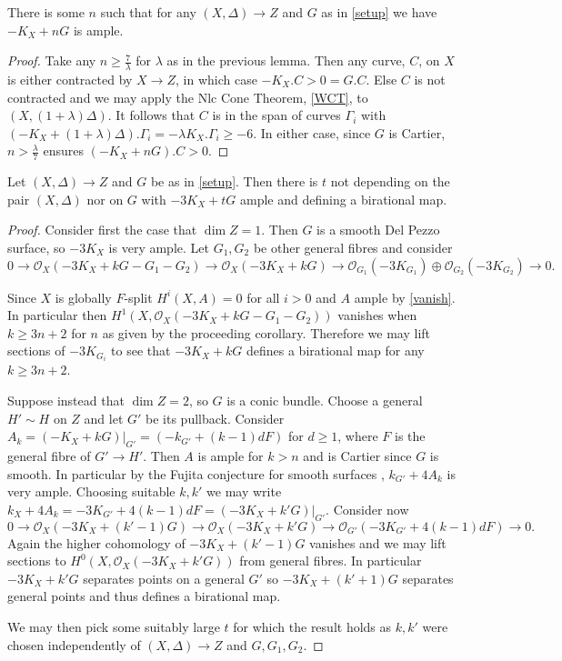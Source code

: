 \documentclass[a4paper,12pt]{book}
\newcommand{\ox}{\mathcal{O}_{X}}
\begin{document}
	\begin{corollary}\label{nAmple}
	There is some $n$ such that for any $(X,\Delta) \to Z$ and $G$ as in \autoref{setup} we have $-K_{X}+nG$ is ample.
\end{corollary}


\begin{proof}
	Take any $n \geq \frac{7}{\lambda}$ for $\lambda$ as in the previous lemma. Then any curve, $C$, on $X$ is either contracted by $X \to Z$, in which case $-K_{X}.C>0=G.C$. Else $C$ is not contracted and we may apply the Nlc Cone Theorem, \autoref{WCT}, to $(X,(1+\lambda)\Delta)$. It follows that $C$ is in the span of curves $\Gamma_{i}$ with $(-K_{X}+(1+\lambda)\Delta).\Gamma_{i} = -\lambda K_{X}.\Gamma_{i} \geq -6$. In either case, since $G$ is Cartier, $n> \frac{\lambda}{7}$ ensures $(-K_{X}+nG).C >0$.
\end{proof}

\begin{theorem}
	Let $(X,\Delta) \to Z$ and $G$ be as in \autoref{setup}. Then there is $t$ not depending on the pair $(X,\Delta)$ nor on $G$ with $-3K_{X}+tG$ ample and defining a birational map. 
\end{theorem}
\begin{proof}
	Consider first the case that $\dim Z=1$. Then $G$ is a smooth Del Pezzo surface, so $-3K_{X}$ is very ample. Let $G_{1},G_{2}$ be other general fibres and consider
	\[0 \to \ox(-3K_{X}+kG-G_{1}-G_{2}) \to \ox(-3K_{X}+kG) \to \mathcal{O}_{G_{1}}(-3K_{G_{1}})\oplus \mathcal{O}_{G_{2}}(-3K_{G_{2}}) \to 0.\]
	
	Since $X$ is globally $F$-split $H^{i}(X,A)=0$ for all $i>0$ and $A$ ample by \autoref{vanish}. In particular then $H^{1}(X,\ox(-3K_{X}+kG-G_{1}-G_{2}))$ vanishes when $k\geq 3n+2$ for $n$ as given by the proceeding corollary. Therefore we may lift sections of $-3K_{G_{i}}$ to see that $-3K_{X}+kG$ defines a birational map for any $k \geq 3n+2$. 

	Suppose instead that $\dim Z=2$, so $G$ is a conic bundle. Choose a general $H'\sim H$ on $Z$ and let $G'$ be its pullback. Consider $A_{k}=(-K_{X}+kG)|_{G'}=(-k_{G'}+(k-1)dF)$ for $d \geq 1$, where $F$ is the general fibre of $G'\to H'$. Then $A$ is ample for $k >n$ and is Cartier since $G$ is smooth. In particular by the Fujita conjecture for smooth surfaces \cite[Corollary 2.5]{terakawa1999d}, $k_{G'}+4A_{k}$ is very ample. Choosing suitable $k,k'$ we may write $k_{X}+4A_{k}=-3K_{G'}+4(k-1)dF=(-3K_{X}+k'G)|_{G'}$. Consider now
	\[0 \to \ox(-3K_{X}+(k'-1)G)\to \ox(-3K_{X}+k'G)\to \mathcal{O}_{G'}(-3K_{G'}+4(k-1)dF) \to 0.\]
	Again the higher cohomology of $-3K_{X}+(k'-1)G$ vanishes and we may lift sections to $H^{0}(X,\ox(-3K_{X}+k'G))$ from general fibres. In particular $-3K_{X}+k'G$ separates points on a general $G'$ so $-3K_{X}+(k'+1)G$ separates general points and thus defines a birational map. 

	We may then pick some suitably large $t$ for which the result holds as $k,k'$ were chosen independently of $(X,\Delta) \to Z$ and $G,G_{1},G_{2}$.
\end{proof}
\end{document}
